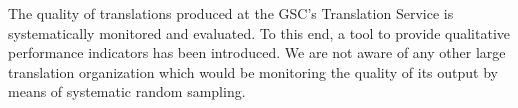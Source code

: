\documentclass[output=paper]{langsci/langscibook}
\begin{document}
The quality of translations produced at the GSC’s Translation Service is systematically monitored and evaluated. To this end, a tool to provide qualitative performance indicators has been introduced. We are not aware of any other large translation organization which would be monitoring the quality of its output by means of systematic random sampling.

 

\sloppy
\printbibliography[heading=subbibliography,notkeyword=this] 
\end{document}
